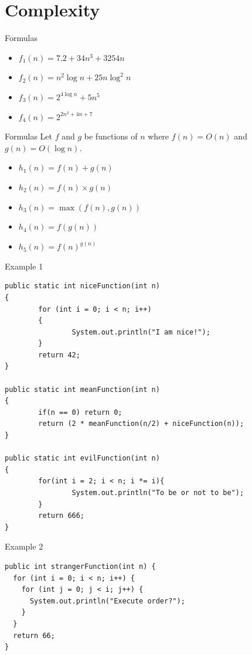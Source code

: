\documentclass[presentation]{beamer}
\begin{document}
\section{Complexity}
\label{sec:org7d31b4b}
\begin{frame}[<+->][label={sec:org1194392}]{Formulas}
\begin{itemize}
\item \(f_1(n) = 7.2 + 34n^3 + 3254n\)
\item \(f_2(n) = n^2\log{n} + 25n\log^2{n}\)
\item \(f_3(n) = 2^{4\log{n}} + 5n^5\)
\item \(f_4(n) = 2^{2n^2 + 4n + 7}\)
\end{itemize}
\end{frame}
\begin{frame}[<+->][label={sec:orgd88a56e}]{Formulas}
Let \(f\) and \(g\) be functions of \(n\) where \(f(n) = O(n)\) and \(g(n) =
O(\log n)\).  
\begin{itemize}
\item \(h_1(n) = f(n) + g(n)\)
\item \(h_2(n) = f(n) \times g(n)\)
\item \(h_3(n) = \max(f(n), g(n))\)
\item \(h_4(n) = f(g(n))\)
\item \(h_5(n) = f(n)^{g(n)}\)
\end{itemize}
\end{frame}
\begin{frame}[label={sec:org9376be1},fragile,shrink=30]{Example 1}
 \begin{verbatim}
public static int niceFunction(int n)
{
        for (int i = 0; i < n; i++)
        {
                System.out.println("I am nice!");
        }
        return 42;
}

public static int meanFunction(int n)
{
        if(n == 0) return 0;
        return (2 * meanFunction(n/2) + niceFunction(n));
}

public static int evilFunction(int n)
{
        for(int i = 2; i < n; i *= i){
                System.out.println("To be or not to be");
        }
        return 666;
}

\end{verbatim}
\end{frame}
\begin{frame}[label={sec:org4c23362},fragile]{Example 2}
 \begin{verbatim}
public int strangerFunction(int n) {
  for (int i = 0; i < n; i++) {
    for (int j = 0; j < i; j++) {
      System.out.println("Execute order?");
    }
  }
  return 66;
}
\end{verbatim}
\end{frame}
\end{document}
